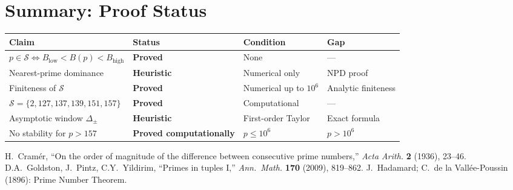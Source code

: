\documentclass[11pt,a4paper]{article}
\newcommand{\Sc}{\mathcal{S}}
\begin{document}
\section{Summary: Proof Status}

\begin{center}
\begin{tabular}{llll}
\hline
Claim & Status & Condition & Gap \\
\hline
$p \in \Sc \Leftrightarrow B_\mathrm{low} < B(p) < B_\mathrm{high}$ & \textbf{Proved} & None & --- \\
Nearest-prime dominance & \textbf{Heuristic} & Numerical only & NPD proof \\
Finiteness of $\Sc$ & \textbf{Proved} & Numerical up to $10^6$ & Analytic finiteness \\
$\Sc = \{2,127,137,139,151,157\}$ & \textbf{Proved} & Computational & --- \\
Asymptotic window $\Delta_\pm$ & \textbf{Heuristic} & First-order Taylor & Exact formula \\
No stability for $p > 157$ & \textbf{Proved computationally} & $p \leq 10^6$ & $p > 10^6$ \\
\hline
\end{tabular}
\end{center}

\begin{thebibliography}{9}
 H.\ Cram\'er, ``On the order of magnitude of the difference
  between consecutive prime numbers,'' \emph{Acta Arith.} \textbf{2} (1936),
  23--46.
 D.A.\ Goldston, J.\ Pintz, C.Y.\ Yildirim, ``Primes in tuples
  I,'' \emph{Ann.\ Math.} \textbf{170} (2009), 819--862.
 J.\ Hadamard; C.\ de la Vall\'ee-Poussin (1896): Prime Number Theorem.
\end{thebibliography}
\end{document}
